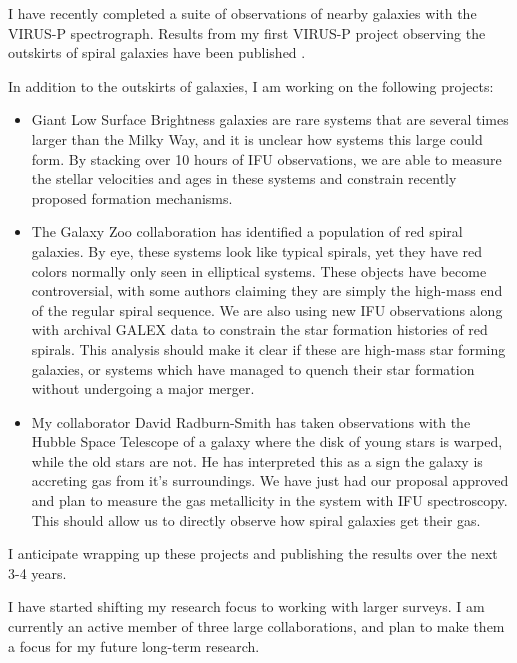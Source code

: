 \documentclass[letterpaper, 11pt]{article}
\newcommand{\upcite}[1]{{\scriptsize{\textsuperscript{\cite{#1}}}}}
\begin{document}
I have recently completed a suite of observations of nearby galaxies with the VIRUS-P spectrograph.   Results from my first VIRUS-P project observing the outskirts of spiral galaxies have been published \upcite{yoachim12}.  

In addition to the outskirts of galaxies, I am working on the following projects:

\begin{itemize}
\item{Giant Low Surface Brightness galaxies are rare systems that are several times larger than the Milky Way, and it is unclear how systems this large could form.  By stacking over 10 hours of IFU observations, we are able to measure the stellar velocities and ages in these systems and constrain recently proposed formation mechanisms.}

\item{The Galaxy Zoo collaboration has identified a population of red spiral galaxies\upcite{Masters09}.  By eye, these systems look like typical spirals, yet they have red colors normally only seen in elliptical systems.  These objects have become controversial, with some authors claiming they are simply the high-mass end of the regular spiral sequence.  We are also using new IFU observations along with archival GALEX data to constrain the star formation histories of red spirals.  This analysis should make it clear if these are high-mass star forming galaxies, or systems which have managed to quench their star formation without undergoing a major merger.}

\item{My collaborator David Radburn-Smith has taken observations with the Hubble Space Telescope of a galaxy where the disk of young stars is warped, while the old stars are not.  He has interpreted this as a sign the galaxy is accreting gas from it's surroundings.  We have just had our proposal approved and plan to measure the gas metallicity in the system with IFU spectroscopy.  This should allow us to directly observe how spiral galaxies get their gas.}
\end{itemize}

I anticipate wrapping up these projects and publishing the results over the next 3-4 years.\\


I have started shifting my research focus to working with larger surveys.  I am currently an active member of three large collaborations, and plan to make them a focus for my future long-term research.
\end{document}
